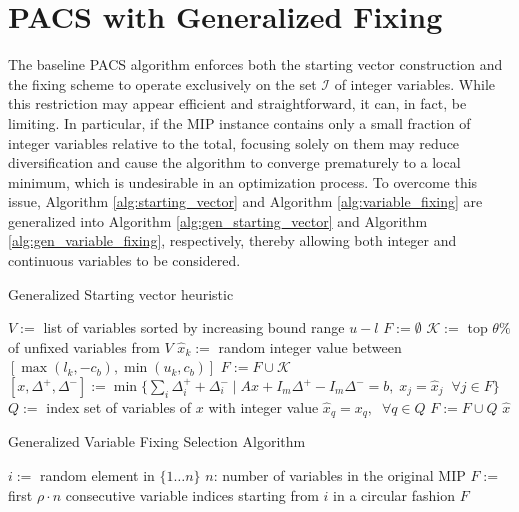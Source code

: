 \section{PACS with Generalized Fixing}\label{sec:gen_fixing}
The baseline PACS algorithm enforces both the starting vector construction and the fixing scheme to operate exclusively on the set $\mathcal{I}$ of integer variables. While this restriction may appear efficient and straightforward, it can, in fact, be limiting. In particular, if the MIP instance contains only a small fraction of integer variables relative to the total, focusing solely on them may reduce diversification and cause the algorithm to converge prematurely to a local minimum, which is undesirable in an optimization process.
To overcome this issue, Algorithm \ref{alg:starting_vector} and Algorithm \ref{alg:variable_fixing} are generalized into Algorithm \ref{alg:gen_starting_vector} and Algorithm \ref{alg:gen_variable_fixing}, respectively, thereby allowing both integer and continuous variables to be considered.
\begin{algorithm}[H]
\caption{Generalized Starting vector heuristic}\label{alg:gen_starting_vector}
\begin{algorithmic}[1]
\State $V :=$ list of  variables sorted by increasing bound range $u-l$
\State $F := \emptyset$
    \State $\mathcal{K} :=$ top $\theta \%$ of unfixed variables from $V$
        \State $\hat{x}_k :=$ random integer value between $[\max(l_k, -c_b), \min(u_k, c_b)]$
    \EndFor
    \State $F := F \cup \mathcal{K}$
    \State $[x, \Delta^+, \Delta^-] := \min\{\sum_i \Delta_i^+ + \Delta_i^- \mid A x + I_m \Delta^+ - I_m \Delta^- = b, \; x_j = \hat{x}_j \;\; \forall j \in F\}$
    \State $Q :=$ index set of  variables of $x$ with integer value
    \State $\hat{x}_q = x_q, \;\; \forall q \in Q$
    \State $F := F \cup Q$
\EndWhile
\State \Return $\hat{x}$
\end{algorithmic}
\end{algorithm}
\begin{algorithm}[H]
\caption{Generalized Variable Fixing Selection Algorithm}\label{alg:gen_variable_fixing}
\begin{algorithmic}[1]
    \State $i :=$ random element in $\{1\dots n\}$ \Comment $n$: number of variables in the original MIP 
    \State $F :=$ first $\rho \cdot n$ consecutive  variable indices starting from $i$ in a circular fashion
    \State \Return $F$
\EndFunction
\end{algorithmic}
\end{algorithm}
